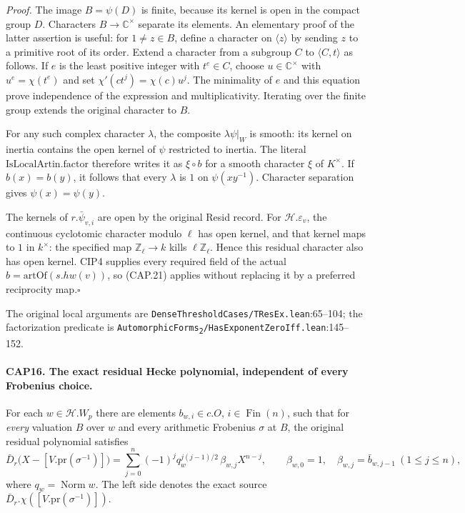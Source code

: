 \emph{Proof.}
The image $B=\psi(D)$ is finite, because its kernel is open in the
compact group $D$.  Characters $B\to\mathbb C^\times$ separate its
elements.  An elementary proof of the latter assertion is useful:
for $1\ne z\in B$, define a character on $\langle z\rangle$ by
sending $z$ to a primitive root of its order.  Extend a character
from a subgroup $C$ to $\langle C,t\rangle$ as follows.  If $e$ is
the least positive integer with $t^e\in C$, choose
$u\in\mathbb C^\times$ with $u^e=\chi(t^e)$ and set
$\chi'(ct^j)=\chi(c)u^j$.  The minimality of $e$ and this equation
prove independence of the expression and multiplicativity.  Iterating
over the finite group extends the original character to $B$.

For any such complex character $\lambda$, the composite
$\lambda\psi|_W$ is smooth: its kernel on inertia contains the
open kernel of $\psi$ restricted to inertia.  The literal
$\mathrm{IsLocalArtin.factor}$ therefore writes it as $\xi\circ b$
for a smooth character $\xi$ of $K^\times$.  If $b(x)=b(y)$, it
follows that every $\lambda$ is $1$ on $\psi(xy^{-1})$.
Character separation gives $\psi(x)=\psi(y)$.

The kernels of $r.\bar\psi_{v,i}$ are open by the original Resid
record.  For $\mathcal H.\varepsilon_v$, the continuous cyclotomic
character modulo $\ell$ has open kernel, and that kernel maps to $1$
in $k^\times$: the specified map $\mathbb Z_\ell\to k$ kills
$\ell\mathbb Z_\ell$.  Hence this residual character also has open
kernel.  CIP4 supplies every required field of the actual
$b=\mathrm{artOf}(s.hw(v))$, so (CAP.21) applies without replacing it
by a preferred reciprocity map.\hfill$\square$

The original local arguments are \nolinkurl{DenseThresholdCases/TResEx.lean}:65--104;
the factorization predicate is
\texttt{AutomorphicForms\textsubscript{2}/HasExponentZeroIff.lean}:145--152.

\paragraph{CAP16. The exact residual Hecke polynomial, independent of every Frobenius choice.}
\label{claim:CAP16}
For each $w\in\mathcal H.W_p$ there are elements
$b_{w,i}\in c.O$, $i\in\operatorname{Fin}(n)$, such that for
\emph{every} valuation $B$ over $w$ and every arithmetic Frobenius
$\sigma$ at $B$, the original residual polynomial satisfies
\[
 \bar D_r\bigl(X-[V.\mathrm{pr}(\sigma^{-1})]\bigr)
   =\sum_{j=0}^{n}
       (-1)^j q_w^{j(j-1)/2}\,\beta_{w,j} X^{n-j},
 \qquad
 \beta_{w,0}=1,\quad \beta_{w,j}=\bar b_{w,j-1}\ (1\leq j\leq n),
 \tag{CAP.22}
\]
where $q_w=\operatorname{Norm}w$.  The left side denotes the exact
source $\bar D_r.\chi([V.\mathrm{pr}(\sigma^{-1})])$.


